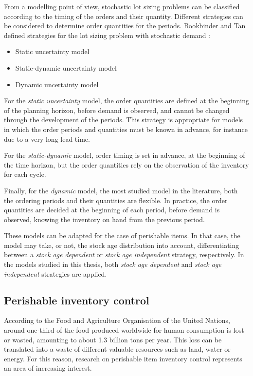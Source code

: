 From a modelling point of view, stochastic lot sizing problems can be classified according to the timing of the orders and their quantity.
Different strategies can be considered to determine order quantities for the periods. Bookbinder and Tan  defined strategies for the lot sizing problem with stochastic demand \cite{BookbinderandTan}:

\begin{itemize}
	\item Static uncertainty model
	\item Static-dynamic uncertainty model
	\item Dynamic uncertainty model
\end{itemize}


For the \emph{static uncertainty} model, the order quantities are defined at the beginning of the planning horizon, before demand is observed, and cannot be changed through the development of the periods.
This strategy is appropriate for models in which the order periods and quantities must be known in advance, for instance due to a very long lead time.

For the \emph{static-dynamic} model, order timing is set in advance, at the beginning of the time horizon, but the order quantities rely on the observation of the inventory for each cycle.

Finally, for the \emph{dynamic} model, the most studied model in the literature, both the ordering periods and their quantities are flexible. In practice, the order quantities are decided at the beginning of each period, before demand is observed, knowing the inventory on hand from the previous period.

These models can be adapted for the case of perishable items. In that case, the model may take, or not, the stock age distribution into account, differentiating between a \emph{stock age dependent} or \emph{stock age independent} strategy, respectively. In the models studied in this thesis, both \emph{stock age dependent} and  \emph{stock age independent} strategies are applied.

\subsection{Perishable inventory control}
\label{subsec:perishableinvcontrol}
According to the Food and Agriculture Organisation of the United Nations, around one-third of the food produced worldwide for human consumption is lost or wasted, amounting to about 1.3 billion tons per year. This loss can be translated into a waste of different valuable resources such as land, water or energy. For this reason, research on perishable item inventory control represents an area of increasing interest.


